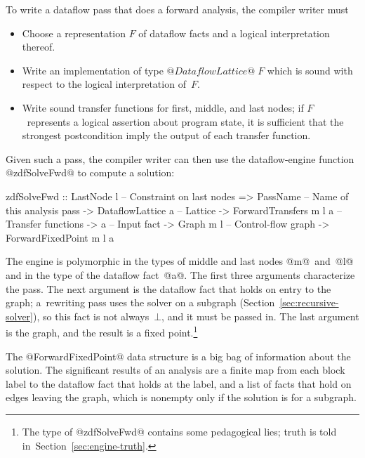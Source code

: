 \documentclass[blockstyle,preprint,nocopyrightspace]{sigplanconf}
\newcommand\secref[1]{Section~\ref{sec:#1}}
\begin{document}
To write a dataflow pass that does a  forward analysis, the compiler
writer must 
\begin{itemize}
\item
Choose a representation $F$ of dataflow facts and a logical interpretation
thereof.
\item
Write an implementation of type $@DataflowLattice@\;F$ which  is sound
with respect to the logical interpretation of~$F$.
\item
Write sound transfer functions for first, middle, and last nodes;
if $F$~represents a logical assertion about program state, it is
sufficient that the strongest postcondition imply the output of each
transfer function.
\end{itemize}
Given such a pass, the compiler writer can then use the
dataflow-engine function @zdfSolveFwd@ to compute a solution:
\begin{code}
  zdfSolveFwd 
    :: LastNode l             -- Constraint on last nodes
    => PassName               -- Name of this analysis pass
    -> DataflowLattice a      -- Lattice
    -> ForwardTransfers m l a -- Transfer functions
    -> a                      -- Input fact
    -> Graph m l              -- Control-flow graph
    -> ForwardFixedPoint m l a
\end{code}
The engine is polymorphic in the types of middle and last nodes
@m@~and~@l@ and in the type of the dataflow fact~@a@.
The first three arguments characterize the pass.
The next argument is the dataflow fact that holds on entry to the graph;
a~rewriting pass uses the solver on a subgraph (\secref{recursive-solver}),
so this fact
is not always~$\bot$, and it must be passed in.
The last argument is the graph, and the result is a 
fixed point.\footnote
{The type of @zdfSolveFwd@ contains some pedagogical lies;
truth is told in~\secref{engine-truth}.}

The @ForwardFixedPoint@ data structure is a big bag
of information about the solution.
The significant results of an analysis are
a finite map from each block label to the dataflow fact that holds at
the label,
and
a list of facts that hold on edges leaving the graph, which is
nonempty only if the solution is for a subgraph.






\iffalse
\begin{code}
class DataflowSolverDirection
        transfers fixedpt where
  zdfSolveFrom :: (DebugNodes m l, Outputable a)
    => BlockEnv a        -- Init facts
    -> PassName          -- Analysis name
    -> DataflowLattice a -- Lattice
    -> transfers m l a   -- Transfers
    -> a                 -- Input fact
    -> Graph m l         -- CFG
    -> DFMonad (fixedpt m l a ())
\end{code}
\fi
\end{document}
